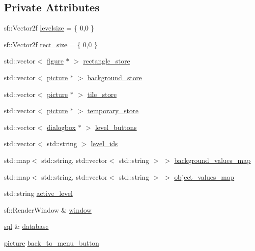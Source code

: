 \subsection*{Private Attributes}
\begin{DoxyCompactItemize}
\item 
sf\+::\+Vector2f \hyperlink{classleveleditor_ace10ab3736e90b40682ab9733b46d8f0}{levelsize} = \{ 0,0 \}
\item 
sf\+::\+Vector2f \hyperlink{classleveleditor_a520e15cb7a61acba59ccd36a951479e5}{rect\+\_\+size} = \{ 0,0 \}
\item 
std\+::vector$<$ \hyperlink{classfigure}{figure} $\ast$ $>$ \hyperlink{classleveleditor_a07af571a23c704edfe87baef71265597}{rectangle\+\_\+store}
\item 
std\+::vector$<$ \hyperlink{classpicture}{picture} $\ast$ $>$ \hyperlink{classleveleditor_adb28cbc235cb4af8b3c4ce8d725a0672}{background\+\_\+store}
\item 
std\+::vector$<$ \hyperlink{classpicture}{picture} $\ast$ $>$ \hyperlink{classleveleditor_a0af5e07c57e50b3ad3d15d7ae64190ce}{tile\+\_\+store}
\item 
std\+::vector$<$ \hyperlink{classpicture}{picture} $\ast$ $>$ \hyperlink{classleveleditor_aebecc1e7c65f9bfd0da843b138fd9e68}{temporary\+\_\+store}
\item 
std\+::vector$<$ \hyperlink{classdialogbox}{dialogbox} $\ast$ $>$ \hyperlink{classleveleditor_a03a8753b5312938d83c67b0873014f6e}{level\+\_\+buttons}
\item 
std\+::vector$<$ std\+::string $>$ \hyperlink{classleveleditor_a02e37e18772af606dce2ee96d59dc7ae}{level\+\_\+ids}
\item 
std\+::map$<$ std\+::string, std\+::vector$<$ std\+::string $>$ $>$ \hyperlink{classleveleditor_a36fa2dbff8ca9dfddb8ff3b6b331e275}{background\+\_\+values\+\_\+map}
\item 
std\+::map$<$ std\+::string, std\+::vector$<$ std\+::string $>$ $>$ \hyperlink{classleveleditor_aec34dfe3c55f923f1a04b63040f70050}{object\+\_\+values\+\_\+map}
\item 
std\+::string \hyperlink{classleveleditor_acb425c1934ea523a6850a160610385d5}{active\+\_\+level}
\item 
sf\+::\+Render\+Window \& \hyperlink{classleveleditor_a95edfc93a38089da61375eef9e65606e}{window}
\item 
\hyperlink{classsql}{sql} \& \hyperlink{classleveleditor_a1b1594767de698a60f38e91690a55a36}{database}
\item 
\hyperlink{classpicture}{picture} \hyperlink{classleveleditor_a8ba58913d3035bc9ae363e1ce72279d3}{back\+\_\+to\+\_\+menu\+\_\+button}

\end{DoxyCompactItemize}
